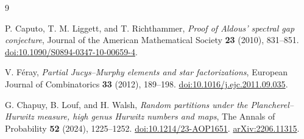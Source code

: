\begin{thebibliography}{9}

P. Caputo, T. M. Liggett, and T. Richthammer,
\emph{Proof of Aldous' spectral gap conjecture},
Journal of the American Mathematical Society \textbf{23} (2010), 831--851.
\href{https://doi.org/10.1090/S0894-0347-10-00659-4}
{doi:10.1090/S0894-0347-10-00659-4}.

V. F\'eray,
\emph{Partial Jucys--Murphy elements and star factorizations},
European Journal of Combinatorics \textbf{33} (2012), 189--198.
\href{https://doi.org/10.1016/j.ejc.2011.09.035}
{doi:10.1016/j.ejc.2011.09.035}.

G. Chapuy, B. Louf, and H. Walsh,
\emph{Random partitions under the Plancherel--Hurwitz measure,
high genus Hurwitz numbers and maps},
The Annals of Probability \textbf{52} (2024), 1225--1252.
\href{https://doi.org/10.1214/23-AOP1651}{doi:10.1214/23-AOP1651}.
\href{https://arxiv.org/abs/2206.11315}{arXiv:2206.11315}.

\end{thebibliography}
